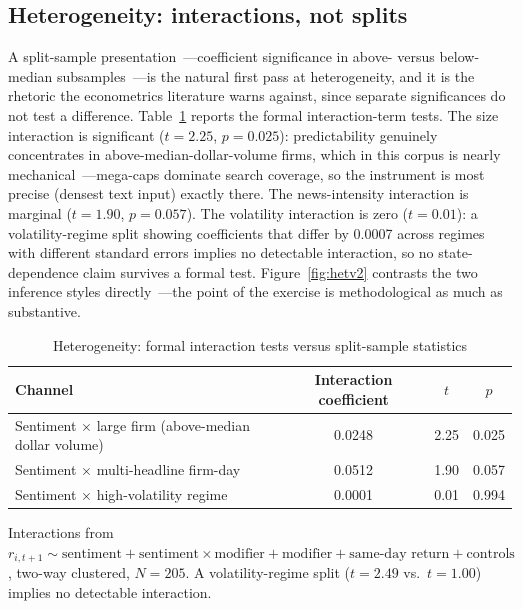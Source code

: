 \subsection{Heterogeneity: interactions, not splits}

A split-sample presentation~---coefficient significance in above- versus below-median subsamples~---is the natural first pass at heterogeneity, and it is the rhetoric the econometrics literature warns against, since separate significances do not test a difference. Table~\ref{tab:inter} reports the formal interaction-term tests. The size interaction is significant ($t=2.25$, $p=0.025$): predictability genuinely concentrates in above-median-dollar-volume firms, which in this corpus is nearly mechanical~---mega-caps dominate search coverage, so the instrument is most precise (densest text input) exactly there. The news-intensity interaction is marginal ($t=1.90$, $p=0.057$). The volatility interaction is zero ($t=0.01$): a volatility-regime split showing coefficients that differ by 0.0007 across regimes with different standard errors implies no detectable interaction, so no state-dependence claim survives a formal test. Figure~\ref{fig:hetv2} contrasts the two inference styles directly~---the point of the exercise is methodological as much as substantive.

\begin{table}[htbp]
\centering
\small
\caption{Heterogeneity: formal interaction tests versus split-sample statistics}
\label{tab:inter}
\begin{threeparttable}
\begin{tabular}{lccc}
\toprule
Channel & Interaction coefficient & $t$ & $p$ \\
\midrule
Sentiment $\times$ large firm (above-median dollar volume) & 0.0248 & 2.25 & 0.025 \\
Sentiment $\times$ multi-headline firm-day & 0.0512 & 1.90 & 0.057 \\
Sentiment $\times$ high-volatility regime & 0.0001 & 0.01 & 0.994 \\
\bottomrule
\end{tabular}
\begin{tablenotes}[flushleft]\footnotesize
\item Interactions from $r_{i,t+1} \sim \text{sentiment} + \text{sentiment}\times\text{modifier} + \text{modifier} + \text{same-day return} + \text{controls}$, two-way clustered, $N=205$. A volatility-regime split ($t=2.49$ vs.\ $t=1.00$) implies no detectable interaction.
\end{tablenotes}
\end{threeparttable}
\end{table}

